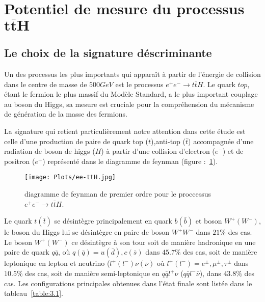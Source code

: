 \section{Potentiel de mesure du processus $\mathbf{t\bar{t}H}$}
\label{p3}

\subsection{Le choix de la signature déscriminante}

Un des processus les plus importants qui appara\^it \`a partir de l'\'energie de collision dans le centre de masse de $500GeV$ est le processus $e^{+}e^{-}{\rightarrow}t\bar{t}H$. Le quark $top$, \'etant le fermion le plus massif du Mod\`ele Standard, a le plus important couplage au boson du Higgs, sa mesure est cruciale pour la compr\'ehension du m\'ecanisme de g\'en\'eration de la masse des fermions.
~\par La signature qui retient particuli\`erement notre attention dans cette \'etude est celle d'une production de paire de quark top ($t$),anti-top ($\bar{t}$) accompagnée d'une radiation de boson de higgs ($H$) \`a partir d'une collision d'electron ($e^{-}$) et de positron ($e^{+}$) représenté dans le diagramme de feynman (figure :~\ref{figure:3.1}).

\begin{figure}[H]
\centering
\texttt{[image: Plots/ee-ttH.jpg]}
\caption{diagramme de feynman de premier ordre pour le proccessus $e^{+}e^{-}{\rightarrow}t\bar{t}H$.}
\label{figure:3.1}
\end{figure}

Le quark $t(\bar{t})$ se d\'esint\`egre principalement en quark $b(\bar{b})$ et boson $W^+(W^-)$, le boson du Higgs lui se d\'esint\`egre en paire de boson $W^+W^-$ dans $21\%$ des cas\cite{1}. Le boson $W^+(W^-)$ ce d\'esint\`egre \`a son tour soit de mani\`ere hadronique en une paire de quark $q\bar{q}$, o\`u $q(\bar{q})=u(\bar{d}),c(\bar{s})$ dans $45.7\%$ des cas, soit de mani\`ere leptonique en lepton et neutrino ($l^+(l^-)\nu(\bar{\nu})$ o\`u $l^+(l^-)=e^{\pm},\mu^{\pm},\tau^{\pm}$ dans $10.5\%$ des cas, soit de mani\`ere semi-leptonique en $q\bar{q}l^+\nu$ ($q\bar{q}l^-\bar{\nu}$), dans $43.8\%$ des cas. Les configurations principales obtenues dans l'\'etat finale sont list\'ee dans le tableau~\ref{table:3.1}.

